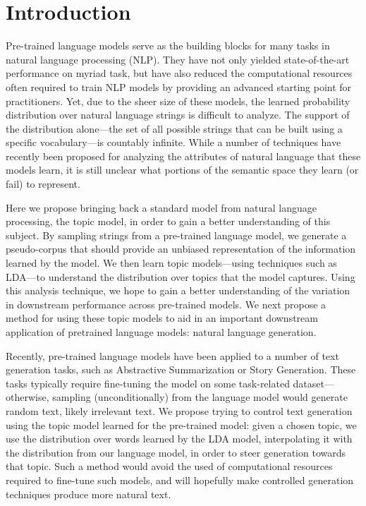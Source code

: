 \chapter{Introduction}\label{chp:introduction}


Pre-trained language models serve as the building blocks for many tasks in natural language processing (NLP). 
They have not only yielded state-of-the-art performance on myriad task, but have also reduced the computational resources often required to train NLP models by providing an advanced starting point for practitioners. Yet, due to the sheer size of these models, the learned probability distribution over natural language strings is difficult to analyze. The support of the distribution alone---the set of all possible strings that can be built using a specific vocabulary---is countably infinite. While a number of techniques have recently been proposed for analyzing the attributes of natural language that these models learn, it is still unclear what portions of the semantic space they learn (or fail) to represent.

Here we propose bringing back a standard model from natural language processing, the topic model, in order to gain a better understanding of this subject. By sampling strings from a pre-trained language model, we generate a pseudo-corpus that should provide an unbiased representation of the information learned by the model. We then learn topic models---using techniques such as LDA---to understand the distribution over topics that the model captures. Using this analysis technique, we hope to gain a better understanding of the variation in downstream performance across pre-trained models. We next propose a method for using these topic models to aid in an important downstream application of pretrained language models: natural language generation.

Recently, pre-trained language models have been applied to a number of text generation tasks, such as Abstractive Summarization or Story Generation. These tasks typically require fine-tuning the model on some task-related dataset---otherwise, sampling (unconditionally) from the language model would generate random text, likely irrelevant text. We propose trying to control text generation using the topic model learned for the pre-trained model: given a chosen topic, we use the distribution over words learned by the LDA model, interpolating it with the distribution from our language model, in order to steer generation towards that topic. Such a method would avoid the used of computational resources required to fine-tune such models, and will hopefully make controlled generation techniques produce more natural text.

